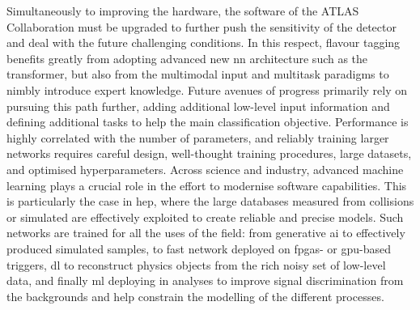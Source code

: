 Simultaneously to improving the hardware, the software of the ATLAS Collaboration must be upgraded to further push the sensitivity of the detector and deal with the future challenging conditions. In this respect, flavour tagging benefits greatly from adopting advanced new \gls{nn} architecture such as the transformer, but also from the multimodal input and multitask paradigms to nimbly introduce expert knowledge. Future avenues of progress primarily rely on pursuing this path further, adding additional low-level input information and defining additional tasks to help the main classification objective. Performance is highly correlated with the number of parameters, and reliably training larger networks requires careful design, well-thought training procedures, large datasets, and optimised hyperparameters. Across science and industry, advanced machine learning plays a crucial role in the effort to modernise software capabilities. This is particularly the case in \gls{hep}, where the large databases measured from collisions or simulated are effectively exploited to create reliable and precise models. Such networks are trained for all the uses of the field: from generative \gls{ai} to effectively produced simulated samples, to fast network deployed on \glspl{fpga}- or \gls{gpu}-based triggers, \gls{dl} to reconstruct physics objects from the rich noisy set of low-level data, and finally \gls{ml} deploying in analyses to improve signal discrimination from the backgrounds and help constrain the modelling of the different processes. 
